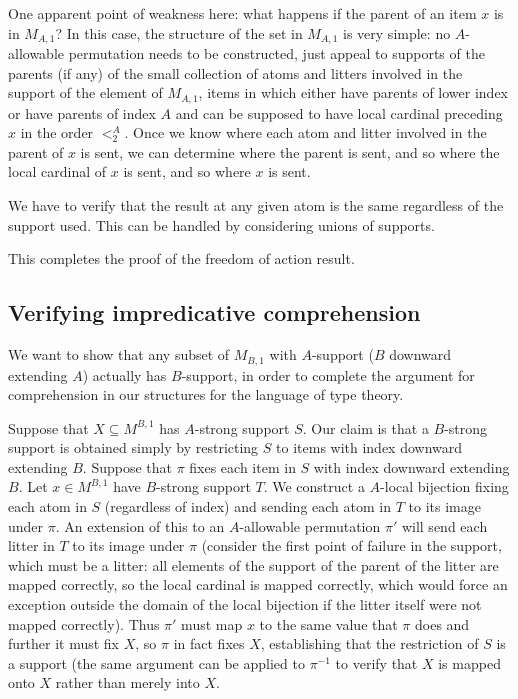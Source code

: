 \documentclass[12pt]{article}
\begin{document}
One apparent point of weakness here:  what happens if the parent of an item $x$ is in $M_{A,1}$?   In this case, the structure of the set in $M_{A,1}$  is very simple:  no $A$-allowable permutation needs
to be constructed, just appeal to supports of the parents (if any) of the small collection of atoms and litters involved in the support of the element of $M_{A,1}$, items in which either have
parents of lower index or have parents of index $A$ and can be supposed to have local cardinal preceding  $x$ in the order $<^A_2$.  Once we know where each atom and litter involved
in the parent of $x$ is sent, we can determine where the parent is sent, and so where the local cardinal of $x$ is sent, and so where $x$ is sent.

We have to verify that the result at any given atom is the same regardless of the support used.  This can be handled by considering unions of supports.

This completes the proof of the freedom of action result.

\subsection{Verifying impredicative comprehension}

We want to show that any subset of $M_{B,1}$ with $A$-support ($B$ downward extending $A$) actually has $B$-support, in order to complete
the argument for comprehension in our structures for the language of type theory.

Suppose that $X \subseteq M^{B,1}$ has $A$-strong support $S$.  Our claim is that a $B$-strong support is obtained simply by restricting $S$ to items with index downward extending $B$.   Suppose that $\pi$ fixes each item in $S$ with index downward extending $B$.  Let $x \in M^{B,1}$ have $B$-strong support $T$.  We construct a $A$-local bijection fixing each
atom in $S$ (regardless of index) and sending each atom  in $T$ to its image under $\pi$.  An extension of this to an $A$-allowable permutation $\pi'$ will send each litter in $T$ to its image under $\pi$ (consider the first point of failure in the support, which must be a litter:  all elements of the support of the parent of the litter are mapped correctly, so the local cardinal is mapped correctly, which would force
an exception outside the domain of the local bijection  if the litter itself were not mapped correctly).  Thus $\pi'$ must map $x$ to the same value that $\pi$ does and further
it must fix $X$, so $\pi$ in fact fixes $X$, establishing that the restriction of $S$ is a support (the same argument can be applied to $\pi^{-1}$ to verify that $X$ is mapped onto $X$ rather than merely into $X$.
\end{document}
